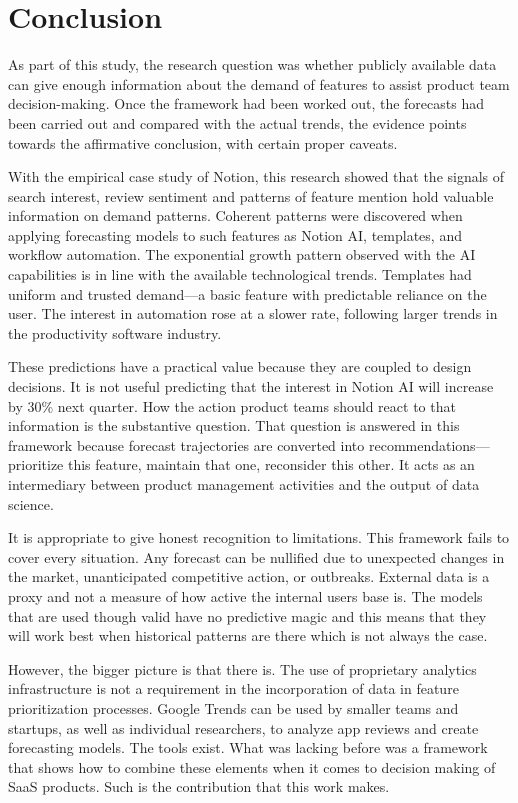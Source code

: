 \section{Conclusion}

As part of this study, the research question was whether publicly available data can give enough information about the demand of features to assist product team decision-making. Once the framework had been worked out, the forecasts had been carried out and compared with the actual trends, the evidence points towards the affirmative conclusion, with certain proper caveats.

With the empirical case study of Notion, this research showed that the signals of search interest, review sentiment and patterns of feature mention hold valuable information on demand patterns. Coherent patterns were discovered when applying forecasting models to such features as Notion AI, templates, and workflow automation. The exponential growth pattern observed with the AI capabilities is in line with the available technological trends. Templates had uniform and trusted demand---a basic feature with predictable reliance on the user. The interest in automation rose at a slower rate, following larger trends in the productivity software industry.

These predictions have a practical value because they are coupled to design decisions. It is not useful predicting that the interest in Notion AI will increase by 30\% next quarter. How the action product teams should react to that information is the substantive question. That question is answered in this framework because forecast trajectories are converted into recommendations---prioritize this feature, maintain that one, reconsider this other. It acts as an intermediary between product management activities and the output of data science.

It is appropriate to give honest recognition to limitations. This framework fails to cover every situation. Any forecast can be nullified due to unexpected changes in the market, unanticipated competitive action, or outbreaks. External data is a proxy and not a measure of how active the internal users base is. The models that are used though valid have no predictive magic and this means that they will work best when historical patterns are there which is not always the case.

However, the bigger picture is that there is. The use of proprietary analytics infrastructure is not a requirement in the incorporation of data in feature prioritization processes. Google Trends can be used by smaller teams and startups, as well as individual researchers, to analyze app reviews and create forecasting models. The tools exist. What was lacking before was a framework that shows how to combine these elements when it comes to decision making of SaaS products. Such is the contribution that this work makes.

